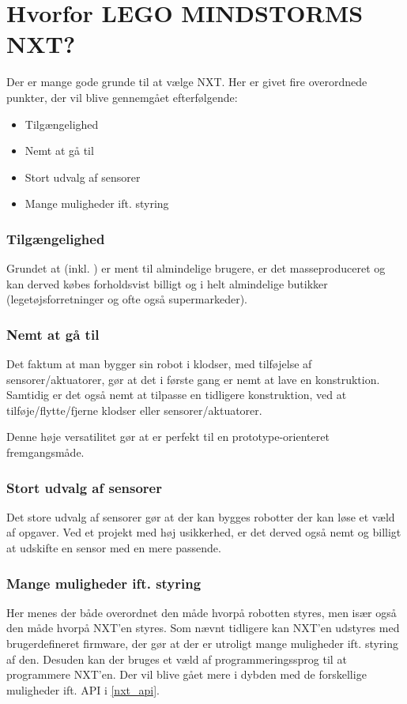 \section{Hvorfor LEGO MINDSTORMS NXT?}
Der er mange gode grunde til at vælge \legoms NXT.
Her er givet fire overordnede punkter, der vil blive gennemgået efterfølgende:

\begin{itemize}
\item{Tilgængelighed}
\item{Nemt at gå til}
\item{Stort udvalg af sensorer}
\item{Mange muligheder ift. styring}
\end{itemize}

\subsubsection{Tilgængelighed}
Grundet at \lego (inkl. \legoms) er ment til almindelige brugere, er det masseproduceret og kan derved købes forholdsvist billigt og i helt almindelige butikker (legetøjsforretninger og ofte også supermarkeder).

\subsubsection{Nemt at gå til}
Det faktum at man bygger sin robot i \lego klodser, med tilføjelse af \legoms sensorer/aktuatorer, gør at det i første gang er nemt at lave en konstruktion.
Samtidig er det også nemt at tilpasse en tidligere konstruktion, ved at tilføje/flytte/fjerne klodser eller sensorer/aktuatorer.

Denne høje versatilitet gør at \lego er perfekt til en prototype-orienteret fremgangsmåde.

\subsubsection{Stort udvalg af sensorer}
Det store udvalg af sensorer gør at der kan bygges robotter der kan løse et væld af opgaver.
Ved et projekt med høj usikkerhed, er det derved også nemt og billigt at udskifte en sensor med en mere passende.

\subsubsection{Mange muligheder ift. styring}
Her menes der både overordnet den måde hvorpå robotten styres, men især også den måde hvorpå NXT'en styres.
Som nævnt tidligere kan NXT'en udstyres med brugerdefineret firmware, der gør at der er utroligt mange muligheder ift. styring af den.
Desuden kan der bruges et væld af programmeringssprog til at programmere NXT'en.
Der vil blive gået mere i dybden med de forskellige muligheder ift. API i \cref{nxt_api}.


